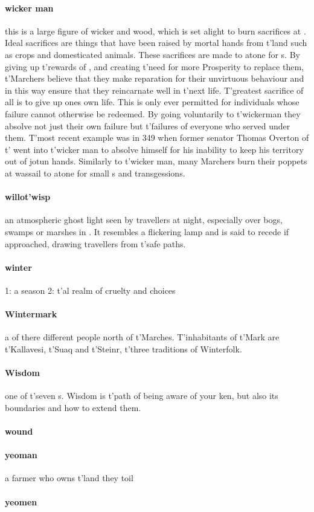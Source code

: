 \paragraph{wicker man} this is a large figure of wicker and wood, which is set alight to burn sacrifices at . Ideal sacrifices are things that have been raised by mortal hands from t'\allowbreak land such as crops and domesticated animals. These sacrifices are made to atone for s. By giving up t'\allowbreak rewards of , and creating t'\allowbreak need for more Prosperity to replace them, t'\allowbreak Marchers believe that they make reparation for their unvirtuous behaviour and in this way ensure that they reincarnate well in t'\allowbreak next life. T'greatest sacrifice of all is to give up ones own life. This is only ever permitted for individuals whose failure cannot otherwise be redeemed. By going voluntarily to t'\allowbreak wickerman they absolve not just their own failure but t'\allowbreak failures of everyone who served under them. T'most recent example was in 349 when former senator Thomas Overton of t'\allowbreak {} went into t'\allowbreak wicker man to absolve himself for his inability to keep his territory out of jotun hands. Similarly to t'\allowbreak wicker man, many Marchers burn their poppets at wassail to atone for small s and transgessions. 
\paragraph{willot'wisp} an atmospheric ghost light seen by travellers at night, especially over bogs, swamps or marshes in . It resembles a flickering lamp and is said to recede if approached, drawing travellers from t'\allowbreak safe paths.
\paragraph{winter} 1: a season 2: t'\allowbreak {}al realm of cruelty and choices
\paragraph{Wintermark} a  of there different people north of t'\allowbreak Marches. T'inhabitants of t'\allowbreak Mark are t'\allowbreak Kallavesi, t'\allowbreak Suaq and t'\allowbreak Steinr, t'\allowbreak three traditions of Winterfolk.
\paragraph{Wisdom} one of t'\allowbreak seven s. Wisdom is t'\allowbreak path of being aware of your ken, but also its boundaries and how to extend them. 
\paragraph{wound} 
\paragraph{yeoman} a farmer who owns t'\allowbreak land they toil
\paragraph{yeomen} 
